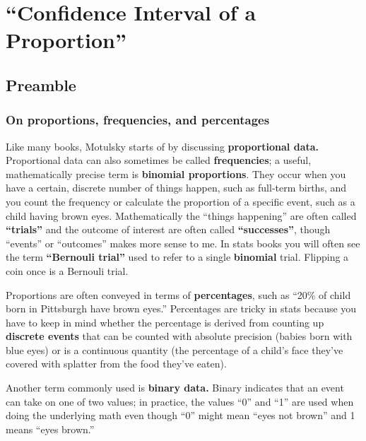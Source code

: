 \documentclass[]{book}
\theoremstyle{definition}
\theoremstyle{definition}
\theoremstyle{definition}
\theoremstyle{remark}
\begin{document}
\chapter{\texorpdfstring{``Confidence Interval of a
Proportion''}{Confidence Interval of a Proportion}}\label{ch4}

\section*{Preamble}\label{preamble}

\subsection*{On proportions, frequencies, and
percentages}\label{on-proportions-frequencies-and-percentages}

Like many books, Motulsky starts of by discussing \textbf{proportional
data.} Proportional data can also sometimes be called
\textbf{frequencies}; a useful, mathematically precise term is
\textbf{binomial proportions}. They occur when you have a certain,
discrete number of things happen, such as full-term births, and you
count the frequency or calculate the proportion of a specific event,
such as a child having brown eyes. Mathematically the ``things
happening'' are often called \textbf{``trials''} and the outcome of
interest are often called \textbf{``successes''}, though ``events'' or
``outcomes'' makes more sense to me. In stats books you will often see
the term \textbf{``Bernouli trial''} used to refer to a single
\textbf{binomial} trial. Flipping a coin once is a Bernouli trial.

Proportions are often conveyed in terms of \textbf{percentages}, such as
``20\% of child born in Pittsburgh have brown eyes.'' Percentages are
tricky in stats because you have to keep in mind whether the percentage
is derived from counting up \textbf{discrete events} that can be counted
with absolute precision (babies born with blue eyes) or is a continuous
quantity (the percentage of a child's face they've covered with splatter
from the food they've eaten).

Another term commonly used is \textbf{binary data.} Binary indicates
that an event can take on one of two values; in practice, the values
``0'' and ``1'' are used when doing the underlying math even though
``0'' might mean ``eyes not brown'' and 1 means ``eyes brown.''
\end{document}
